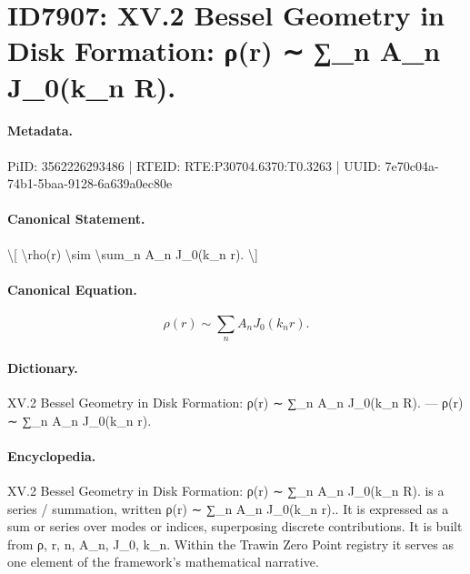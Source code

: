 \section*{ID7907: XV.2 Bessel Geometry in Disk Formation: ρ(r) ∼ ∑\_n A\_n J\_0(k\_n R).}
\paragraph{Metadata.}
PiID: 3562226293486 | RTEID: RTE:P30704.6370:T0.3263 | UUID: 7e70c04a-74b1-5baa-9128-6a639a0ec80e

\paragraph{Canonical Statement.}
\textbackslash{}[ \textbackslash{}rho(r) \textbackslash{}sim \textbackslash{}sum\_n A\_n J\_0(k\_n r). \textbackslash{}]

\paragraph{Canonical Equation.}
\[
\rho(r) \sim \sum_n A_n J_0(k_n r).
\]

\paragraph{Dictionary.}
XV.2 Bessel Geometry in Disk Formation: ρ(r) ∼ ∑\_n A\_n J\_0(k\_n R). — ρ(r) ∼ ∑\_n A\_n J\_0(k\_n r).

\paragraph{Encyclopedia.}
XV.2 Bessel Geometry in Disk Formation: ρ(r) ∼ ∑\_n A\_n J\_0(k\_n R). is a series / summation, written ρ(r) ∼ ∑\_n A\_n J\_0(k\_n r).. It is expressed as a sum or series over modes or indices, superposing discrete contributions. It is built from ρ, r, n, A\_n, J\_0, k\_n. Within the Trawin Zero Point registry it serves as one element of the framework's mathematical narrative.
